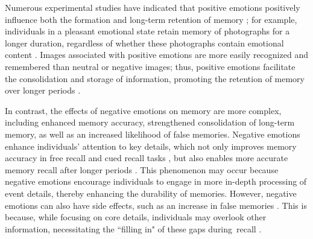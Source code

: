 Numerous experimental studies have indicated that positive emotions positively influence both the formation and long-term retention of memory \cite{tyng2017influences}; for example, individuals in a pleasant emotional state retain memory of photographs for a longer duration, regardless of whether these photographs contain emotional content \cite{hanson2014happy}. Images associated with positive emotions are more easily recognized and remembered than neutral or negative images; thus, positive emotions facilitate the consolidation and storage of information, promoting the retention of memory over longer periods \cite{chainay2012emotional}.

In contrast, the effects of negative emotions on memory are more complex, including enhanced memory accuracy, strengthened consolidation of long-term memory, as well as an increased likelihood of false memories. Negative emotions enhance individuals' attention to key details, which not only improves memory accuracy in free recall and cued recall tasks \cite{kensinger2007negative, kensinger2020retrieval, xie2017negative}, but also enables more accurate memory recall after longer periods \cite{van2015good}. This phenomenon may occur because negative emotions encourage individuals to engage in more in-depth processing of event details, thereby enhancing the durability of memories. However, negative emotions can also have side effects, such as an increase in false memories \cite{marchewka2016arousal}. This is because, while focusing on core details, individuals may overlook other information, necessitating the ``filling in" of these gaps during~recall \cite{brainerd2008does}.

